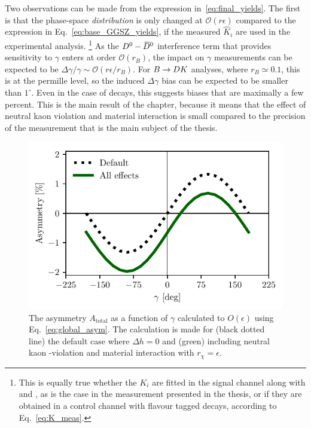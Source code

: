  
Two observations can be made from the expression in~\eqref{eq:final_yields}. The first is that the phase-space \emph{distribution} is only changed at $\mathcal O(r\epsilon)$ compared to the expression in Eq.~\eqref{eq:base_GGSZ_yields}, if the measured $\hat K_i$ are used in the experimental analysis. \footnote{This is equally true whether the $K_i$ are fitted in the signal channel along with \xpm and \ypm, as is the case in the measurement presented in the thesis, or if they are obtained in a control channel with flavour tagged \D decays, according to Eq.~\eqref{eq:K_meas}.} As the ${{D}^0}-{{\kern 0.18em\overline{\kern -0.18em D}}{}^0}$ interference term that provides sensitivity to $\gamma$ enters at order $\mathcal O(r_B)$, the impact on $\gamma$ measurements can be expected to be $\Delta\gamma/\gamma\sim \mathcal O(r\epsilon/r_B)$. For ${B}\rightarrow{\ensuremath{D}} K$ analyses, where $r_B\simeq0.1$, this is at the permille level, so the induced $\Delta\gamma$ bias can be expected to be smaller than $1^\circ$. Even in the case of \BtoDpi decays, this suggests biases that are maximally a few percent. This is the main result of the chapter, because it means that the effect of neutral kaon \CP violation and material interaction is small compared to the precision of the measurement that is the main subject of the thesis.

\begin{figure}[tb]
    \centering{}
    \includegraphics{figures/ks_chapter/paper_asym_for_gammas.pdf}
    \caption{The asymmetry $A_\text{total}$ as a function of $\gamma$ calculated to $O(\epsilon)$ using Eq.~\eqref{eq:global_asym}. The calculation is made for (black dotted line) the default case where $\Delta h = 0$ and (green) including neutral kaon \CP-violation and material interaction with $r_\chi=\epsilon$.}
    \label{fig:global_asym}
\end{figure}

